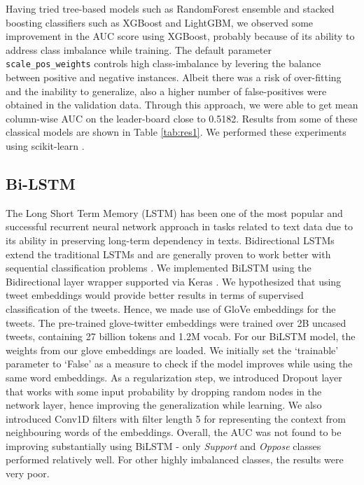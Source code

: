 Having tried tree-based models such as RandomForest ensemble and stacked boosting classifiers such as XGBoost\cite{chen2016xgboost} and LightGBM\cite{ke2017lightgbm}, we observed some improvement in the AUC score using XGBoost, probably because of its ability to address class imbalance while training. The default parameter \verb|scale_pos_weights| controls high class-imbalance by levering the balance between positive and negative instances. Albeit there was a risk of over-fitting and the inability to generalize, also a higher number of false-positives were obtained in the validation data. Through this approach, we were able to get mean column-wise AUC on the leader-board close to 0.5182.
Results from some of these classical models are shown in Table \ref{tab:res1}. We performed these experiments using scikit-learn \cite{scikit-learn}.
\subsection{Bi-LSTM}

The Long Short Term Memory (LSTM)\cite{hochreiter1997lstm} has been one of the most popular and successful recurrent neural network approach in tasks related to text data due to its ability in preserving long-term dependency in texts.
 Bidirectional LSTMs \cite{huang2015bidirectional} extend the traditional LSTMs and are generally proven to work better with sequential classification problems \cite{graves2005framewise}. We implemented BiLSTM using the Bidirectional layer wrapper supported via Keras \cite{chollet2015keras}.
We hypothesized that using tweet embeddings would provide better results in terms of supervised classification of the tweets. Hence, we made use of GloVe \cite{pennington2014glove} embeddings for the tweets. 
The pre-trained glove-twitter embeddings were trained over 2B uncased tweets, containing 27 billion tokens and 1.2M vocab. For our BiLSTM model, the weights from our glove embeddings are loaded.  We initially set the `trainable' parameter to `False' as a measure to check if the model improves while using the same word embeddings. As a regularization step, we introduced Dropout \cite{JMLR:v15:srivastava14a} layer that works with some input probability by dropping random nodes in the network layer, hence improving the generalization while learning. We also introduced Conv1D filters with filter length 5 for representing the context from neighbouring words of the embeddings. Overall, the AUC was not found to be improving substantially using BiLSTM - only \textit{Support} and \textit{Oppose} classes performed relatively well. For other highly imbalanced classes, the results were very poor.

